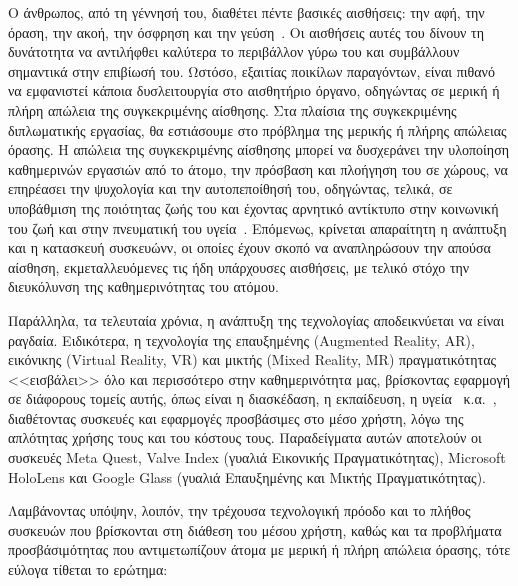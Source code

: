 
\setlength{\parindent}{24pt}
Ο άνθρωπος, από τη γέννησή του, διαθέτει πέντε βασικές αισθήσεις: την αφή, την όραση, την ακοή, την όσφρηση και την γεύση~\cite{bradford_2017_the}. Οι αισθήσεις αυτές του δίνουν τη δυνάτοτητα να αντιλήφθει καλύτερα το περιβάλλον γύρω του και συμβάλλουν σημαντικά στην επιβίωσή του. Ωστόσο, εξαιτίας ποικίλων παραγόντων, είναι πιθανό να εμφανιστεί κάποια δυσλειτουργία στο αισθητήριο όργανο, οδηγώντας σε μερική ή πλήρη απώλεια της συγκεκριμένης αίσθησης. Στα πλαίσια της συγκεκριμένης διπλωματικής εργασίας, θα εστιάσουμε στο πρόβλημα της μερικής ή πλήρης απώλειας όρασης. Η απώλεια της συγκεκριμένης αίσθησης μπορεί να δυσχεράνει την υλοποίηση καθημερινών εργασιών από το άτομο, την πρόσβαση και πλοήγηση του σε χώρους, να επηρέασει την ψυχολογία και την αυτοπεποίθησή του, οδηγώντας, τελικά, σε υποβάθμιση της ποιότητας ζωής του και έχοντας αρνητικό αντίκτυπο στην κοινωνική του ζωή και στην πνευματική του υγεία~\cite{worldhealthorganization_2023_blindness}\cite{maaikelangelaan_2007_quality}. Επόμενως, κρίνεται απαραίτητη η ανάπτυξη και η κατασκευή συσκευώνν, οι οποίες έχουν σκοπό να αναπληρώσουν την απούσα αίσθηση, εκμεταλλευόμενες τις ήδη υπάρχουσες αισθήσεις, με τελικό στόχο την διευκόλυνση της καθημερινότητας του ατόμου.

Παράλληλα, τα τελευταία χρόνια, η ανάπτυξη της τεχνολογίας αποδεικνύεται να είναι ραγδαία. Ειδικότερα, η τεχνολογία της επαυξημένης (Augmented Reality, AR), εικόνικης (Virtual Reality, VR) και μικτής (Mixed Reality, MR) πραγματικότητας <<εισβάλει>> όλο και περισσότερο στην καθημερινότητα μας, βρίσκοντας εφαρμογή σε διάφορους τομείς αυτής, όπως είναι η διασκέδαση, η εκπαίδευση, η υγεία~\cite{morgan_2021_the} κ.α.~\cite{wikipediacontributors_2019_mixed}, διαθέτοντας συσκευές και εφαρμογές προσβάσιμες στο μέσο χρήστη, λόγω της απλότητας χρήσης τους και του κόστους τους. Παραδείγματα αυτών αποτελούν οι συσκευές Meta Quest, Valve Index (γυαλιά Εικονικής Πραγματικότητας), Microsoft HoloLens και Google Glass (γυαλιά Επαυξημένης και Μικτής Πραγματικότητας). %

Λαμβάνοντας υπόψην, λοιπόν, την τρέχουσα τεχνολογική πρόοδο και το πλήθος συσκευών που βρίσκονται στη διάθεση του μέσου χρήστη, καθώς και τα προβλήματα προσβάσιμότητας που αντιμετωπίζουν άτομα με μερική ή πλήρη απώλεια όρασης, τότε εύλογα τίθεται το ερώτημα:


